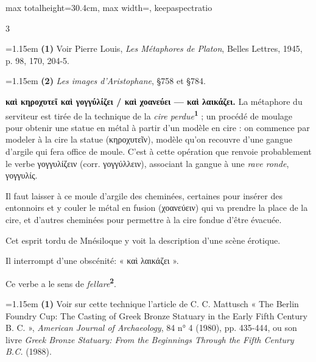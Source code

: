 \documentclass[11pt,twoside]{book}
\newcommand{\italique}[1]{\textit{#1}}
\newcommand{\latin}[1]{\textit{#1}}
\newcommand{\marqueur}[1]{\textsuperscript{\color{rubricRed}\textbf{#1}}}
\begin{document}
\begin{adjustbox}{max totalheight=30.4cm, max width=\textwidth, keepaspectratio}
\begin{minipage}{\textwidth}
{\begin{multicols}{3}
\par\vspace{1.5pt}
\par\vspace{1.2pt}\par\nopagebreak\vspace{1pt}\noindent\hangindent=1.15em {\color{sepiaNote}\textbf{(1)}} Voir Pierre Louis, \italique{Les Métaphores de Platon}, Belles Lettres, 1945, p. 98, 170, 204-5.
\par\vspace{1.5pt}
\noindent\hangindent=1.15em {\color{sepiaNote}\textbf{(2)}} \italique{Les images d'Aristophane}, §758 et §784.
\par\vspace{1.5pt}
 \textbf{καὶ κηροχυτεῖ καὶ γογγύλίζει / καὶ χοανεύει — καὶ λαικάζει.} La métaphore du serviteur est tirée de la technique de la \italique{cire perdue}\marqueur{1} ; un procédé de moulage pour obtenir une statue en métal à partir d'un modèle en cire : on commence par modeler à la cire la statue (κηροχυτεῖν), modèle qu'on recouvre d'une gangue d'argile qui fera office de moule. C'est à cette opération que renvoie probablement le verbe γογγυλίζειν (corr. γογγύλλειν), associant la gangue à une \italique{rave ronde}, γογγυλίς.
\par\vspace{1.5pt}
\noindent Il faut laisser à ce moule d'argile des cheminées, certaines pour insérer des entonnoirs et y couler le métal en fusion (χοανεύειν) qui va prendre la place de la cire, et d'autres cheminées pour permettre à la cire fondue d'être évacuée.
\par\vspace{1.5pt}
\noindent Cet esprit tordu de Mnésiloque y voit la description d'une scène érotique.
\par\vspace{1.5pt}
\noindent Il interrompt d'une obscénité: « καὶ λαικάζει ».
\par\vspace{1.5pt}
\noindent Ce verbe a le sens de \latin{fellare}\marqueur{2}.
\par\vspace{1.5pt}
\par\vspace{1.2pt}\par\nopagebreak\vspace{1pt}\noindent\hangindent=1.15em {\color{sepiaNote}\textbf{(1)}} Voir sur cette technique l'article de C. C. Mattusch « The Berlin Foundry Cup: The Casting of Greek Bronze Statuary in the Early Fifth Century B. C. », \italique{American Journal of Archaeology}, 84 n° 4 (1980), pp. 435-444, ou son livre \italique{Greek Bronze Statuary: From the Beginnings Through the Fifth Century B.C.} (1988).

\end{multicols}}
\end{minipage}
\end{adjustbox}
\end{document}
